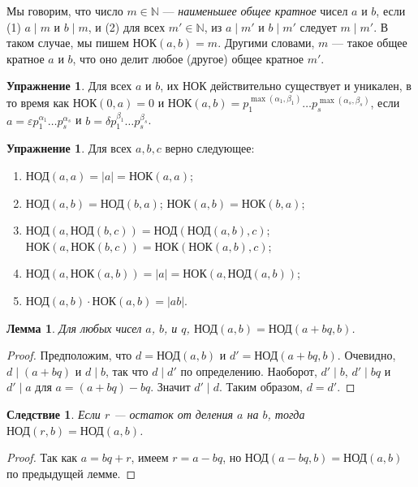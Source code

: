 \documentclass[12pt,notitlepage]{article}
\theoremstyle{plain}
\newtheorem{lemma}[thm]{Лемма}
\newtheorem{corr}[thm]{Следствие}
\theoremstyle{definition}
\newtheorem{exc}[thm]{Упражнение}
\theoremstyle{plain}
\newcommand{\N}{\mathbb{N}}
\newcommand{\eps}{\varepsilon}
\newcommand{\1}{\mathbf{1}}
\newcommand{\0}{\mathbf{0}}
\newcommand{\dvd}{\mathop{\mid}}
\DeclareMathOperator{\lcm}{lcm}
\newcommand{\mcomm}[1]{}
\begin{document}
Мы говорим, что число $m \in \N$ --- \emph{наименьшее общее кратное} чисел $a$ и $b$, если (1) $a \dvd m$ и $b \dvd m$, и (2) для всех $m' \in \N$, из $a \dvd m'$ и $b \dvd m'$ следует $m \dvd m'$. В таком случае, мы пишем $\text{НОК}(a, b) = m$. Другими словами, $m$ --- такое общее кратное $a$ и $b$, что оно делит любое (другое) общее кратное $m'$.
\begin{exc}
	Для всех $a$ и $b$, их НОК действительно существует и уникален, в то время как $\text{НОК}(0, a) = 0$ и $\text{НОК}(a, b) = p^{\max(\alpha_1, \beta_1)}_1\ldots p^{\max(\alpha_s, \beta_s)}_s$, если $a = \eps p^{\alpha_1}_1\ldots p^{\alpha_s}_s$ и $b = \delta p^{\beta_1}_1\ldots p^{\beta_s}_s$.
\end{exc}
\mcomm{There is a clear similarity between $\gcd$ and minimum (respectively, $\lcm$ and maximum)---since both are infima for suitable posets (we will elaborate on the idea later). The Instructor might want to highlight this fact.}
\begin{exc} Для всех $a, b, c$ верно следующее:
	\begin{enumerate}
		\item $\text{НОД}(a, a) = |a| = \text{НОК}(a, a)$;
		\item $\text{НОД}(a, b) = \text{НОД}(b,a)$; $\text{НОК}(a, b) = \text{НОК}(b,a)$;
		\item $\text{НОД}(a, \text{НОД}(b, c)) = \text{НОД}(\text{НОД}(a, b), c)$; $\text{НОК}(a, \text{НОК}(b, c)) = \text{НОК}(\text{НОК}(a, b), c)$;
		\item $\text{НОД}(a, \text{НОК}(a, b)) = |a| = \text{НОК}(a,\text{НОД}(a, b))$;
		\item $\text{НОД}(a,b)\cdot \text{НОК}(a, b) = |ab|$.
	\end{enumerate}
\end{exc}

\begin{lemma}
	Для любых чисел $a$, $b$, и $q$, $\text{НОД}(a, b) = \text{НОД}(a + bq, b)$.
\end{lemma}
\begin{proof}
	Предположим, что $d = \text{НОД}(a,b)$ и $d' = \text{НОД}(a + bq, b)$. Очевидно, $d \dvd (a + bq)$ и $d \dvd b$, так что $d \dvd d'$ по определению. Наоборот, $d' \dvd b$, $d' \dvd bq$ и $d' \dvd a$ для $a = (a + bq) - bq$. Значит $d' \dvd d$. Таким образом, $d = d'$.
\end{proof}

\begin{corr}\label{L5:c_gcd_rem}
	Если $r$ --- остаток от деления $a$ на $b$, тогда $\text{НОД}(r, b) = \text{НОД}(a, b)$.
\end{corr}
\begin{proof}
	Так как $a = bq + r$, имеем $r = a - bq$, но $\text{НОД}(a - bq, b) = \text{НОД}(a, b)$ по предыдущей лемме.
\end{proof}
\end{document}
